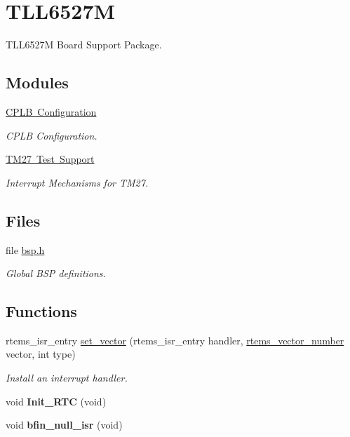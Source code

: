 \hypertarget{group__RTEMSBSPsBfinTLL6527M}{}\section{T\+L\+L6527M}
\label{group__RTEMSBSPsBfinTLL6527M}


T\+L\+L6527M Board Support Package.  


\subsection*{Modules}
\begin{DoxyCompactItemize}
\item 
\mbox{\hyperlink{group__tll6527m__cplb}{C\+P\+L\+B Configuration}}
\begin{DoxyCompactList}\small\item\em C\+P\+LB Configuration. \end{DoxyCompactList}\item 
\mbox{\hyperlink{group__tll6527m__tm27}{T\+M27 Test Support}}
\begin{DoxyCompactList}\small\item\em Interrupt Mechanisms for T\+M27. \end{DoxyCompactList}\end{DoxyCompactItemize}
\subsection*{Files}
\begin{DoxyCompactItemize}
\item 
file \mbox{\hyperlink{bsps_2bfin_2TLL6527M_2include_2bsp_8h}{bsp.\+h}}
\begin{DoxyCompactList}\small\item\em Global B\+SP definitions. \end{DoxyCompactList}\end{DoxyCompactItemize}
\subsection*{Functions}
\begin{DoxyCompactItemize}
\item 
rtems\+\_\+isr\+\_\+entry \mbox{\hyperlink{group__RTEMSBSPsBfinTLL6527M_gab3388042c56b34c40be81fd5f028d97e}{set\+\_\+vector}} (rtems\+\_\+isr\+\_\+entry handler, \mbox{\hyperlink{group__ClassicINTR_ga3e434c197d99f128e78cae4d9358bd8b}{rtems\+\_\+vector\+\_\+number}} vector, int type)
\begin{DoxyCompactList}\small\item\em Install an interrupt handler. \end{DoxyCompactList}\item 
\mbox{\label{group__RTEMSBSPsBfinTLL6527M_ga715337dfa6294a1b8c668475ccf0b1f2}} 
void {\bfseries Init\+\_\+\+R\+TC} (void)
\item 
\mbox{\label{group__RTEMSBSPsBfinTLL6527M_ga8520241d1f72a31de60aa3cefb69a93d}} 
void {\bfseries bfin\+\_\+null\+\_\+isr} (void)
\end{DoxyCompactItemize}
